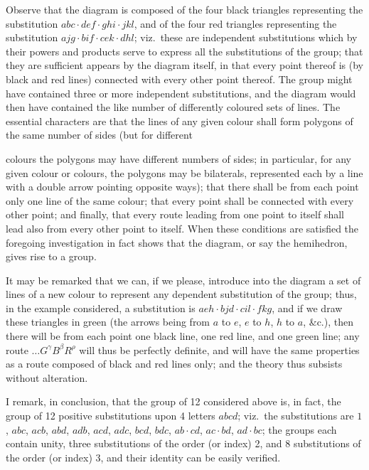 \documentclass[11pt,a4paper]{article}
\begin{document}
\medskip

Observe that the diagram is composed of the four black triangles representing the substitution $abc\cdot def\cdot ghi\cdot jkl$, and of the four red triangles representing the substitution $ajg\cdot bif\cdot cek\cdot dhl$; viz.\ these are independent substitutions which by their powers and products serve to express all the substitutions of the group; that they are sufficient appears by the diagram itself, in that every point thereof is (by black and red lines) connected with every other point thereof. The group might have contained three or more independent substitutions, and the diagram would then have contained the like number of differently coloured sets of lines. The essential characters are that the lines of any given colour shall form polygons of the same number of sides (but for different

\newpage


\noindent colours the polygons may have different numbers of sides; in particular, for any given colour or colours, the polygons may be bilaterals, represented each by a line with a double arrow pointing opposite ways); that there shall be from each point only one line of the same colour; that every point shall be connected with every other point; and finally, that every route leading from one point to itself shall lead also from every other point to itself. When these conditions are satisfied the foregoing investigation in fact shows that the diagram, or say the hemihedron, gives rise to a group.

\medskip

It may be remarked that we can, if we please, introduce into the diagram a set of lines of a new colour to represent any dependent substitution of the group; thus, in the example considered, a substitution is $aeh\cdot bjd\cdot cil\cdot fkg$, and if we draw these triangles in green (the arrows being from $a$ to $e$, $e$ to $h$, $h$ to $a$, \&c.), then there will be from each point one black line, one red line, and one green line; any route $\ldots G^{\gamma}B^{\beta}R^{\rho}$ will thus be perfectly definite, and will have the same properties as a route composed of black and red lines only; and the theory thus subsists without alteration.

\medskip

I remark, in conclusion, that the group of 12 considered above is, in fact, the group of 12 positive substitutions upon 4 letters $abcd$; viz.\ the substitutions are $1$, $abc$, $acb$, $abd$, $adb$, $acd$, $adc$, $bcd$, $bdc$, $ab\cdot cd$, $ac\cdot bd$, $ad\cdot bc$; the groups each contain unity, three substitutions of the order (or index) 2, and 8 substitutions of the order (or index) 3, and their identity can be easily verified.
\end{document}
